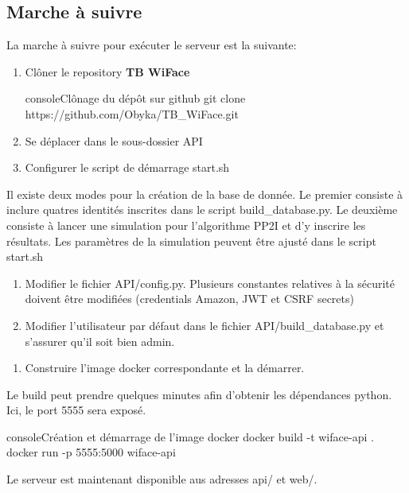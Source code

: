 \subsection{Marche à suivre}
La marche à suivre pour exécuter le serveur est la suivante:
\begin{enumerate}
    \item Clôner le repository \textbf{TB WiFace}
    \begin{listingsbox}{console}{Clônage du dépôt sur github}
git clone https://github.com/Obyka/TB_WiFace.git
    \end{listingsbox}
    \item{Se déplacer dans le sous-dossier API}
    \item{Configurer le script de démarrage start.sh}
\end{enumerate}
    Il existe deux modes pour la création de la base de donnée. Le premier
    consiste à inclure quatres identités inscrites dans le script build\_database.py.
    Le deuxième consiste à lancer une simulation pour l'algorithme PP2I et d'y inscrire les résultats.
    Les paramètres de la simulation peuvent être ajusté dans le script start.sh
    
    
\begin{enumerate}[resume]
    \item Modifier le fichier API/config.py. Plusieurs constantes relatives à la sécurité doivent être modifiées (credentials Amazon, JWT et CSRF secrets)
    \item Modifier l'utilisateur par défaut dans le fichier API/build\_database.py et s'assurer qu'il soit bien admin.
\end{enumerate}

\begin{enumerate}[resume]
    \item Construire l'image docker correspondante et la démarrer.
\end{enumerate}

Le build peut prendre quelques minutes afin d'obtenir les dépendances python.
Ici, le port 5555 sera exposé.
\begin{listingsbox}{console}{Création et démarrage de l'image docker}
docker build -t wiface-api .
docker run -p 5555:5000 wiface-api
\end{listingsbox}

Le serveur est maintenant disponible aus adresses api/ et web/.
